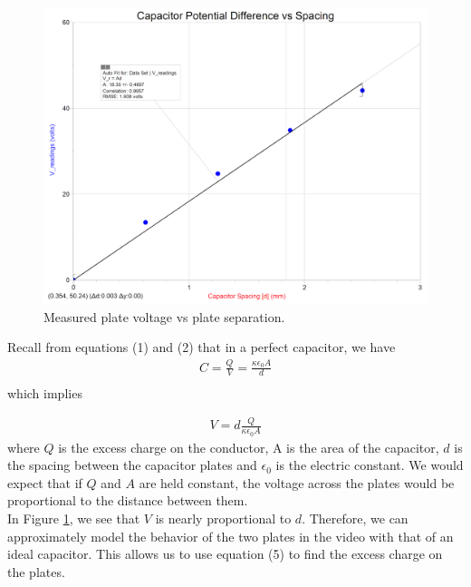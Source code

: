 \documentclass[oneside,12pt]{amsart}
\begin{document}
\begin{figure}[h]
	\includegraphics[width=\medgraph,scale=0.01]{VoltvDistance.png}
	\caption{Measured plate voltage vs plate separation.}
	\label{VvD}
\end{figure}

	\indent Recall from equations (1) and (2) that in a perfect capacitor, we have 
	\begin{align*}
	C = \frac{Q}{V} =  \frac{\kappa \epsilon _{0}A}{d}\\
	\end{align*}
	which implies
	
	\begin{align}
	V = d\frac{Q}{\kappa\epsilon_0A}
	\end{align}
	 where $Q$ is the excess charge on the conductor, A is the area of the capacitor, $d$ is the spacing between the capacitor plates and $\epsilon_0$ is the electric constant. We would expect that if $Q$ and $A$ are held constant, the voltage across the plates would be proportional to the distance between them.\\
	 
	 \indent In Figure \ref{VvD}, we see that $V$ is nearly proportional to $d$. Therefore, we can approximately model the behavior of the two plates in the video with that of an ideal capacitor. This allows us to use equation (5) to find the excess charge on the plates.\\
	 
\end{document}
